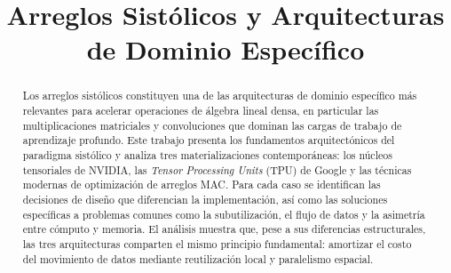 \documentclass[conference]{IEEEtran}
\begin{document}
\title{Arreglos Sistólicos y Arquitecturas de Dominio Específico}

\author{
\and

\and

\and

}

\maketitle
\thispagestyle{firstpage} 

\begin{abstract}
Los arreglos sistólicos constituyen una de las arquitecturas de dominio específico más relevantes para acelerar operaciones de álgebra lineal densa, en particular las multiplicaciones matriciales y convoluciones que dominan las cargas de trabajo de aprendizaje profundo. Este trabajo presenta los fundamentos arquitectónicos del paradigma sistólico y analiza tres materializaciones contemporáneas: los núcleos tensoriales de NVIDIA, las \textit{Tensor Processing Units} (TPU) de Google y las técnicas modernas de optimización de arreglos MAC. Para cada caso se identifican las decisiones de diseño que diferencian la implementación, así como las soluciones específicas a problemas comunes como la subutilización, el flujo de datos y la asimetría entre cómputo y memoria. El análisis muestra que, pese a sus diferencias estructurales, las tres arquitecturas comparten el mismo principio fundamental: amortizar el costo del movimiento de datos mediante reutilización local y paralelismo espacial.
\end{abstract}
\end{document}
